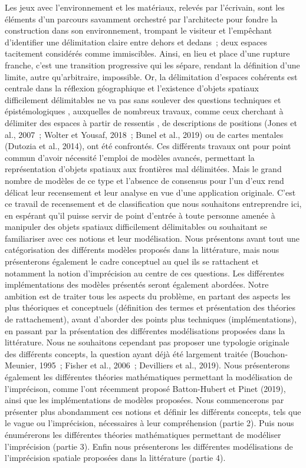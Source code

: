 Les jeux avec l’environnement et les matériaux, relevés par
l’écrivain, sont les éléments d’un parcours savamment orchestré par
l’architecte pour fondre la construction dans son environnement,
trompant le visiteur et l’empêchant d’identifier une délimitation
claire entre dehors et dedans ; deux espaces tacitement considérés
comme immiscibles. Ainsi, en lieu et place d’une rupture franche,
c’est une transition progressive qui les sépare, rendant la définition
d’une limite, autre qu’arbitraire, impossible.  Or, la délimitation
d’espaces cohérents est centrale dans la réflexion géographique et
l’existence d’objets spatiaux difficilement délimitables ne va pas
sans soulever des questions techniques et épistémologiques
\autocite{Burrough1996b}, auxquelles de nombreux travaux, comme ceux
cherchant à délimiter des espaces à partir de ressentis
\autocite{Arabacioglu2010}, de descriptions de positions (Jones et
al., 2007 ; Wolter et Yousaf, 2018 ; Bunel et al., 2019) ou de cartes
mentales (Dutozia et al., 2014), ont été confrontés. Ces différents
travaux ont pour point commun d’avoir nécessité l’emploi de modèles
avancés, permettant la représentation d’objets spatiaux aux frontières
mal délimitées. Mais le grand nombre de modèles de ce type et
l’absence de consensus pour l’un d’eux rend délicat leur recensement
et leur analyse en vue d’une application originale.  C’est ce travail
de recensement et de classification que nous souhaitons entreprendre
ici, en espérant qu’il puisse servir de point d’entrée à toute
personne amenée à manipuler des objets spatiaux difficilement
délimitables ou souhaitant se familiariser avec ces notions et leur
modélisation. Nous présentons avant tout une catégorisation des
différents modèles proposés dans la littérature, mais nous
présenterons également le cadre conceptuel au quel ils se rattachent
et notamment la notion d’imprécision au centre de ces questions. Les
différentes implémentations des modèles présentés seront également
abordées. Notre ambition est de traiter tous les aspects du problème,
en partant des aspects les plus théoriques et conceptuels (définition
des termes et présentation des théories de rattachement), avant
d’aborder des points plus techniques (implémentations), en passant par
la présentation des différentes modélisations proposées dans la
littérature.  Nous ne souhaitons cependant pas proposer une typologie
originale des différents concepts, la question ayant déjà été
largement traitée (Bouchon-Meunier, 1995 ; Fisher et al., 2006 ;
Devilliers et al., 2019). Nous présenterons également les différentes
théories mathématiques permettant la modélisation de l’imprécison,
comme l’ont récemment proposé Batton-Hubert et Pinet (2019), ainsi que
les implémentations de modèles proposées.  Nous commencerons par
présenter plus abondamment ces notions et définir les différents
concepts, tels que le vague ou l’imprécision, nécessaires à leur
compréhension (partie 2). Puis nous énumérerons les différentes
théories mathématiques permettant de modéliser l’imprécision (partie
3). Enfin nous présenterons les différentes modélisations de
l’imprécision spatiale proposées dans la littérature (partie 4).


